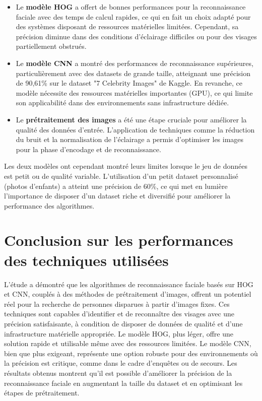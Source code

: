 \documentclass[a4paper,12pt]{report}
\begin{document}
\begin{itemize}
    \item Le \textbf{modèle HOG} a offert de bonnes performances pour la reconnaissance faciale avec des temps de calcul rapides, ce qui en fait un choix adapté pour des systèmes disposant de ressources matérielles limitées. Cependant, sa précision diminue dans des conditions d’éclairage difficiles ou pour des visages partiellement obstrués.
    \item Le \textbf{modèle CNN} a montré des performances de reconnaissance supérieures, particulièrement avec des datasets de grande taille, atteignant une précision de 90,61\% sur le dataset "7 Celebrity Images" de Kaggle. En revanche, ce modèle nécessite des ressources matérielles importantes (GPU), ce qui limite son applicabilité dans des environnements sans infrastructure dédiée.
    \item Le \textbf{prétraitement des images} a été une étape cruciale pour améliorer la qualité des données d’entrée. L’application de techniques comme la réduction du bruit et la normalisation de l’éclairage a permis d'optimiser les images pour la phase d’encodage et de reconnaissance.
\end{itemize}
Les deux modèles ont cependant montré leurs limites lorsque le jeu de données est petit ou de qualité variable. L’utilisation d'un petit dataset personnalisé (photos d’enfants) a atteint une précision de 60\%, ce qui met en lumière l'importance de disposer d’un dataset riche et diversifié pour améliorer la performance des algorithmes.


\section{Conclusion sur les performances des techniques utilisées}
L’étude a démontré que les algorithmes de reconnaissance faciale basés sur HOG et CNN, couplés à des méthodes de prétraitement d’images, offrent un potentiel réel pour la recherche de personnes disparues à partir d’images fixes. Ces techniques sont capables d'identifier et de reconnaître des visages avec une précision satisfaisante, à condition de disposer de données de qualité et d'une infrastructure matérielle appropriée.
Le modèle HOG, plus léger, offre une solution rapide et utilisable même avec des ressources limitées. Le modèle CNN, bien que plus exigeant, représente une option robuste pour des environnements où la précision est critique, comme dans le cadre d’enquêtes ou de secours. Les résultats obtenus montrent qu'il est possible d’améliorer la précision de la reconnaissance faciale en augmentant la taille du dataset et en optimisant les étapes de prétraitement.
\end{document}
